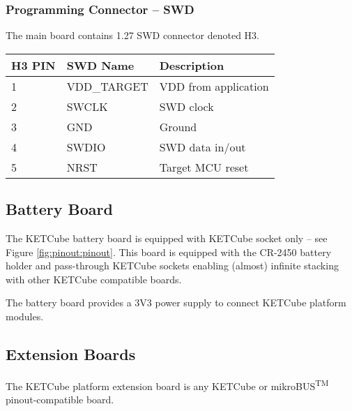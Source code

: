 \documentclass[twoside,a4paper]{refart}
\begin{document}
   
\subsubsection{Programming Connector -- SWD}

  The main board contains 1.27 SWD connector denoted H3.

   \begin{table*}[!ht]
    \hspace*{-4cm}
    \begin{tabular}{| p{2cm} | p{3cm} | p{7cm} |}
        \hline
        \rowcolor{SeaGreen3!30!} {\bf H3 PIN} & {\bf SWD Name} & {\bf Description} \\
        \hline
        \hline
        1 & VDD\_TARGET & VDD from application\\
        \hline
        2 & SWCLK & SWD clock\\
        \hline
        3 & GND & Ground\\
        \hline
        4 & SWDIO & SWD data in/out\\
        \hline
        5 & NRST & Target MCU reset\\
        \hline
    \end{tabular}
    \label{tab:boards:MBP}
   \end{table*}

   \newpage
   
\subsection{Battery Board}
  The KETCube battery board is equipped with KETCube socket only -- see Figure \ref{fig:pinout:pinout}. This board is equipped with the CR-2450 battery holder and pass-through KETCube sockets enabling (almost) infinite stacking with other KETCube compatible boards.
  
  The battery board provides a 3V3 power supply to connect KETCube platform modules.
  
  
\subsection{Extension Boards}
  The KETCube platform extension board is any KETCube or mikroBUS\textsuperscript{TM} pinout-compatible board.
\end{document}
